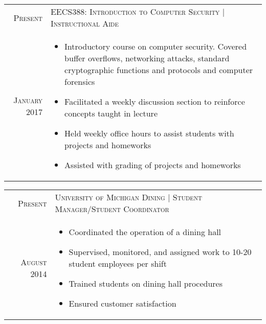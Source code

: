 %
%
%
\begin{longtable}{R{\leftcolumn}|p{\rightcolumnlength}}
  \textsc{Present}    & \textsc{EECS388: Introduction to Computer Security | Instructional Aide}   								\\
  \textsc{January 2017}    & \begin{minipage}[t]{\rightcolumnlength}
\begin{itemize}
\item Introductory course on computer security. Covered buffer overflows, networking attacks, standard cryptographic functions and protocols and computer forensics
\item Facilitated a weekly discussion section to reinforce concepts taught in lecture
\item Held weekly office hours to assist students with projects and homeworks
\item Assisted with grading of projects and homeworks
\end{itemize}
                   \end{minipage}		
  \end{longtable}
\begin{longtable}{R{\leftcolumn}|p{\rightcolumnlength}}
  \textsc{Present}    & \textsc{University of Michigan Dining | Student Manager/Student Coordinator}   								\\
  \textsc{August 2014}    & \begin{minipage}[t]{\rightcolumnlength}
\begin{itemize}
\item Coordinated the operation of a dining hall
\item Supervised, monitored, and assigned work to 10-20 student employees per shift
\item Trained students on dining hall procedures
\item Ensured customer satisfaction 
\end{itemize}
                   \end{minipage}		
  \end{longtable}
